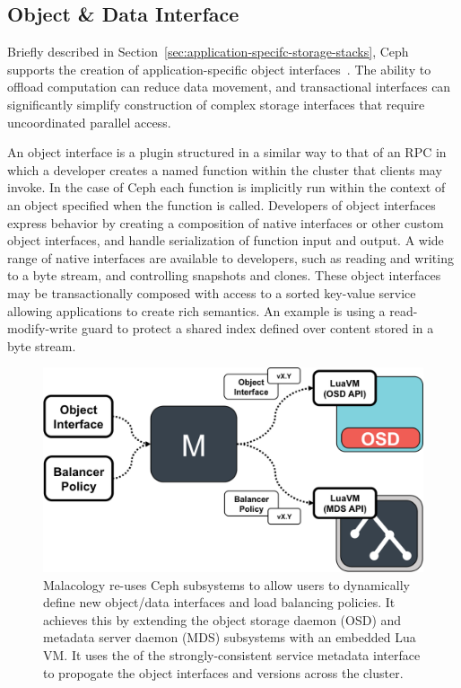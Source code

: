\documentclass[preprint]{sigplanconf-eurosys}
\begin{document}
\subsection{Object \& Data Interface}
\label{object-data-interface}

Briefly described in Section~\ref{sec:application-specifc-storage-stacks}, Ceph
supports the creation of application-specific object
interfaces~\cite{weil_rados_2007}. The ability to offload computation can
reduce data movement, and transactional interfaces can significantly simplify
construction of complex storage interfaces that require uncoordinated parallel
access. 

An object interface is a plugin structured in a similar way to that of an RPC
in which a developer creates a named function within the cluster that clients
may invoke. In the case of Ceph each function is implicitly run within the
context of an object specified when the function is called. Developers of
object interfaces express behavior by creating a composition of native
interfaces or other custom object interfaces, and handle serialization of
function input and output. A wide range of native interfaces are available to
developers, such as reading and writing to a byte stream, and controlling
snapshots and clones. These object interfaces may be transactionally composed
with access to a sorted key-value service allowing applications to create rich
semantics. An example is using a read-modify-write guard to protect a shared
index defined over content stored in a byte stream.

\begin{figure}[htbp]
\centering
\includegraphics{figures/implementation.png}
\caption{Malacology re-uses Ceph subsystems to allow users to dynamically
define new object/data interfaces and load balancing policies. It achieves this
by extending the object storage daemon (OSD) and metadata server daemon (MDS)
subsystems with an embedded Lua VM.  It uses the of the strongly-consistent
service metadata interface to propogate the object interfaces and versions
across the cluster.
\label{fig:implementation}} \end{figure}
\end{document}
